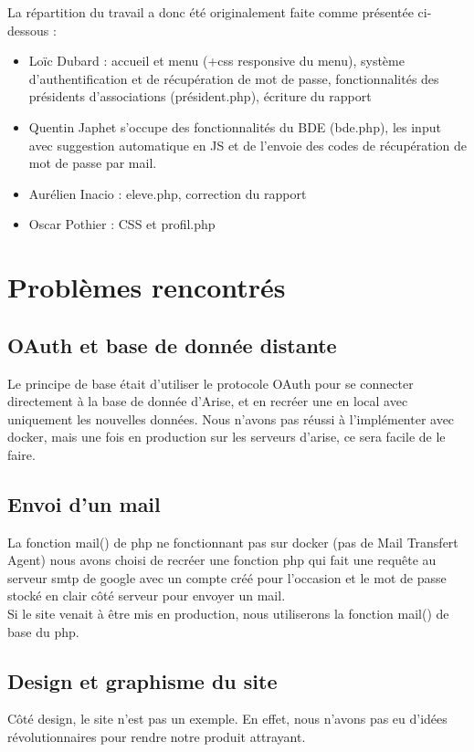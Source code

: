 \documentclass[french]{article}
\begin{document}
La répartition du travail a donc été originalement faite comme présentée ci-dessous : \\

\begin{itemize}
	\item Loïc Dubard : accueil et menu (+css responsive du menu), système d'authentification et de récupération de mot de passe, fonctionnalités des présidents d'associations (président.php), écriture du rapport\\ 
	\item Quentin Japhet s'occupe des fonctionnalités du BDE (bde.php), les input avec suggestion automatique en JS et de l'envoie des codes de récupération de mot de passe par mail. \\
	\item Aurélien Inacio : eleve.php, correction du rapport\\
	\item Oscar Pothier : CSS et profil.php\\
\end{itemize}

\section{Problèmes rencontrés}
\subsection{OAuth et base de donnée distante}
Le principe de base était d'utiliser le protocole OAuth pour se connecter directement à la base de donnée d'Arise, et en recréer une en local avec uniquement les nouvelles données. Nous n'avons pas réussi à l'implémenter avec docker, mais une fois en production sur les serveurs d'arise, ce sera facile de le faire.  

\subsection{Envoi d'un mail}
La fonction mail() de php ne fonctionnant pas sur docker (pas de Mail Transfert Agent) nous avons choisi de recréer une fonction php qui fait une requête au serveur smtp de google avec un compte créé pour l'occasion et le mot de passe stocké en clair côté serveur pour envoyer un mail.\\

Si le site venait à être mis en production, nous utiliserons la fonction mail() de base du php.\\

\subsection{Design et graphisme du site}
Côté design, le site n'est pas un exemple. En effet, nous n'avons pas eu d'idées révolutionnaires pour rendre notre produit attrayant.
\end{document}
